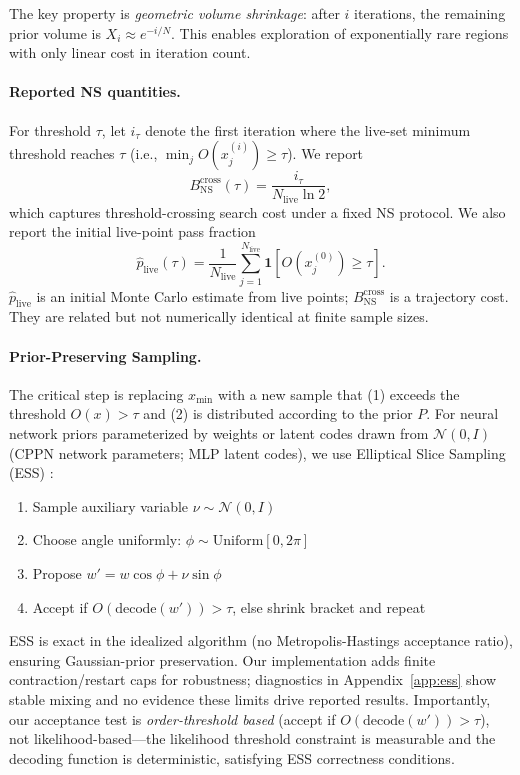 \documentclass{article}
\begin{document}
The key property is \emph{geometric volume shrinkage}: after $i$ iterations, the remaining prior volume is $X_i \approx e^{-i/N}$. This enables exploration of exponentially rare regions with only linear cost in iteration count.

\paragraph{Reported NS quantities.}
For threshold $\tau$, let $i_\tau$ denote the first iteration where the live-set minimum threshold reaches $\tau$ (i.e., $\min_j O(x_j^{(i)}) \ge \tau$). We report
\[
B_{\text{NS}}^{\text{cross}}(\tau)=\frac{i_\tau}{N_{\text{live}}\ln 2},
\]
which captures threshold-crossing search cost under a fixed NS protocol. We also report the initial live-point pass fraction
\[
\hat p_{\text{live}}(\tau)=\frac{1}{N_{\text{live}}}\sum_{j=1}^{N_{\text{live}}}\mathbf{1}[O(x^{(0)}_j)\ge\tau].
\]
$\hat p_{\text{live}}$ is an initial Monte Carlo estimate from live points; $B_{\text{NS}}^{\text{cross}}$ is a trajectory cost. They are related but not numerically identical at finite sample sizes.

\paragraph{Prior-Preserving Sampling.}
The critical step is replacing $x_{\min}$ with a new sample that (1) exceeds the threshold $O(x) > \tau$ and (2) is distributed according to the prior $P$. For neural network priors parameterized by weights or latent codes drawn from $\mathcal{N}(0, I)$ (CPPN network parameters; MLP latent codes), we use Elliptical Slice Sampling (ESS) \cite{murray2010elliptical}:

\begin{enumerate}
    \item Sample auxiliary variable $\nu \sim \mathcal{N}(0, I)$
    \item Choose angle uniformly: $\phi \sim \text{Uniform}[0, 2\pi]$
    \item Propose $w' = w \cos\phi + \nu \sin\phi$
    \item Accept if $O(\text{decode}(w')) > \tau$, else shrink bracket and repeat
\end{enumerate}

ESS is exact in the idealized algorithm (no Metropolis-Hastings acceptance ratio), ensuring Gaussian-prior preservation. Our implementation adds finite contraction/restart caps for robustness; diagnostics in Appendix~\ref{app:ess} show stable mixing and no evidence these limits drive reported results. Importantly, our acceptance test is \emph{order-threshold based} (accept if $O(\text{decode}(w')) > \tau$), not likelihood-based---the likelihood threshold constraint is measurable and the decoding function is deterministic, satisfying ESS correctness conditions.
\end{document}
